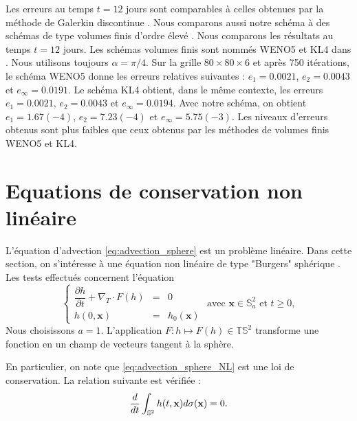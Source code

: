 Les erreurs au temps $t=12$ jours sont comparables à celles obtenues par la méthode de Galerkin discontinue \cite{Nair2008}. Nous comparons aussi notre schéma à des schémas de type volumes finis d'ordre élevé \cite{Katta2015}. Nous comparons les résultats au temps $t=12$ jours. Les schémas volumes finis sont nommés WENO5 et KL4 dans \cite{Katta2015}. Nous utilisons toujours $\alpha = \pi/4$. Sur la grille $80 \times 80 \times 6$ et après 750 itérations, le schéma WENO5 donne les erreurs relatives suivantes : $e_1 = 0.0021$, $e_2 = 0.0043$ et $e_{\infty} = 0.0191$. Le schéma KL4 obtient, dans le même contexte, les erreurs $e_1 = 0.0021$, $e_2 = 0.0043$ et $e_{\infty} = 0.0194$. Avec notre schéma, on obtient $e_1 = 1.67(-4)$, $e_2=7.23(-4)$ et $e_{\infty} = 5.75(-3)$. Les niveaux d'erreurs obtenus sont plus faibles que ceux obtenus par les méthodes de volumes finis WENO5 et KL4.


























\section{Equations de conservation non linéaire}

L'équation d'advection \eqref{eq:advection_sphere} est un problème linéaire. Dans cette section, on s'intéresse à une équation non linéaire de type "Burgers" sphérique \cite{BenArtzi2009}. Les tests effectués concernent l'équation
\begin{equation}
\left\lbrace
\begin{array}{rcl}
\dfrac{\partial h}{\partial t} + \nabla_T \cdot F(h) & = & 0 \\
h(0,\mathbf{x}) & = & h_0(\mathbf{x})
\end{array}
\right. \text{ avec } \mathbf{x} \in \mathbb{S}^2_a \text{ et } t \geq 0,
\label{eq:advection_sphere_NL}
\end{equation}
Nous choisissons $a = 1$. L'application $F : h \mapsto F(h) \in \mathbb{T}\mathbb{S}^2$ transforme une fonction en un champ de vecteurs tangent à la sphère.

En particulier, on note que \eqref{eq:advection_sphere_NL} est une loi de conservation. La relation suivante est vérifiée :
\begin{equation}
\dfrac{d}{dt} \displaystyle\int_{\mathbb{S}^2} h(t,\mathbf{x}) d \sigma(\mathbf{x}) = 0.
\end{equation}

